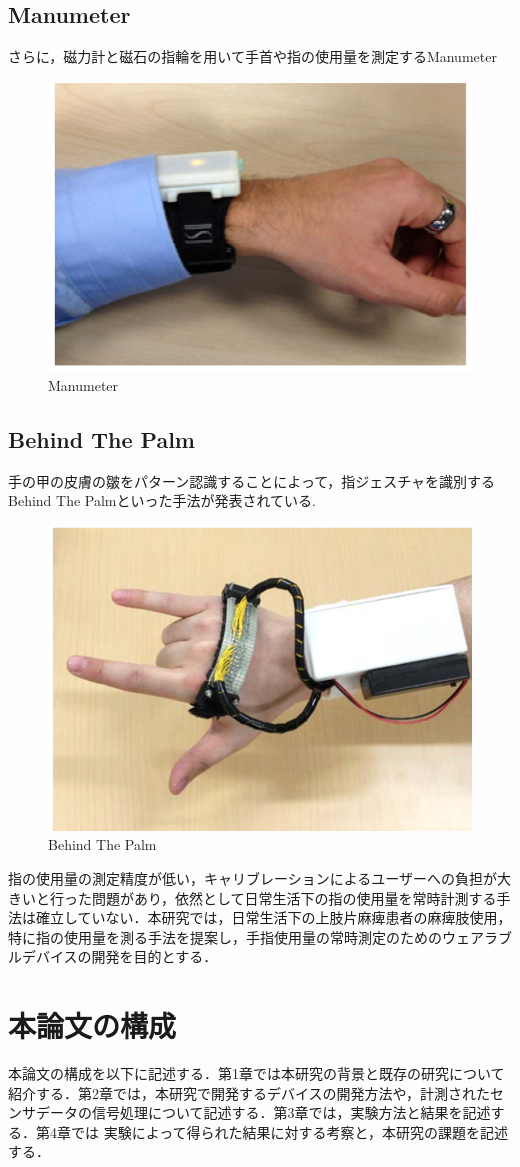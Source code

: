 \subsection*{Manumeter}
さらに，磁力計と磁石の指輪を用いて手首や指の使用量を測定するManumeter\cite{Friedman2014}
\begin{figure}[H]
  \centering
  \includegraphics[width=0.6\linewidth]{fig/ch1/manumeter}
  \caption{Manumeter}
  \label{fig:Manumeter}
\end{figure}

\subsection*{Behind The Palm}
手の甲の皮膚の皺をパターン認識することによって，指ジェスチャを識別するBehind The Palm\cite{Recognition2017}といった手法が発表されている.
\begin{figure}[H]
  \centering
  \includegraphics[width=0.6\linewidth]{fig/ch1/btp}
  \caption{Behind The Palm}
  \label{fig:Behind The Palm}
\end{figure}


指の使用量の測定精度が低い，キャリブレーションによるユーザーへの負担が大きいと行った問題があり，依然として日常生活下の指の使用量を常時計測する手法は確立していない．本研究では，日常生活下の上肢片麻痺患者の麻痺肢使用，特に指の使用量を測る手法を提案し，手指使用量の常時測定のためのウェアラブルデバイスの開発を目的とする．

\section{本論文の構成}
本論文の構成を以下に記述する．第1章では本研究の背景と既存の研究について紹介する．第2章では，本研究で開発するデバイスの開発方法や，計測されたセンサデータの信号処理について記述する．第3章では，実験方法と結果を記述する．第4章では
実験によって得られた結果に対する考察と，本研究の課題を記述する．